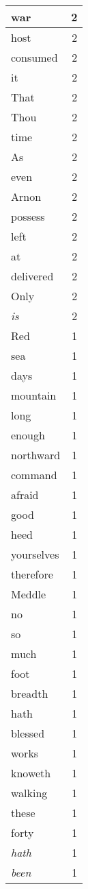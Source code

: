 \begin{center}
\begin{longtable}{l|r}
war & 2 \\ \hline
host & 2 \\ \hline
consumed & 2 \\ \hline
it & 2 \\ \hline
That & 2 \\ \hline
Thou & 2 \\ \hline
time & 2 \\ \hline
As & 2 \\ \hline
even & 2 \\ \hline
Arnon & 2 \\ \hline
possess & 2 \\ \hline
left & 2 \\ \hline
at & 2 \\ \hline
delivered & 2 \\ \hline
Only & 2 \\ \hline
\emph{is} & 2 \\ \hline
Red & 1 \\ \hline
sea & 1 \\ \hline
days & 1 \\ \hline
mountain & 1 \\ \hline
long & 1 \\ \hline
enough & 1 \\ \hline
northward & 1 \\ \hline
command & 1 \\ \hline
afraid & 1 \\ \hline
good & 1 \\ \hline
heed & 1 \\ \hline
yourselves & 1 \\ \hline
therefore & 1 \\ \hline
Meddle & 1 \\ \hline
no & 1 \\ \hline
so & 1 \\ \hline
much & 1 \\ \hline
foot & 1 \\ \hline
breadth & 1 \\ \hline
hath & 1 \\ \hline
blessed & 1 \\ \hline
works & 1 \\ \hline
knoweth & 1 \\ \hline
walking & 1 \\ \hline
these & 1 \\ \hline
forty & 1 \\ \hline
\emph{hath} & 1 \\ \hline
\emph{been} & 1 \\ \hline

\end{longtable}
\end{center}

